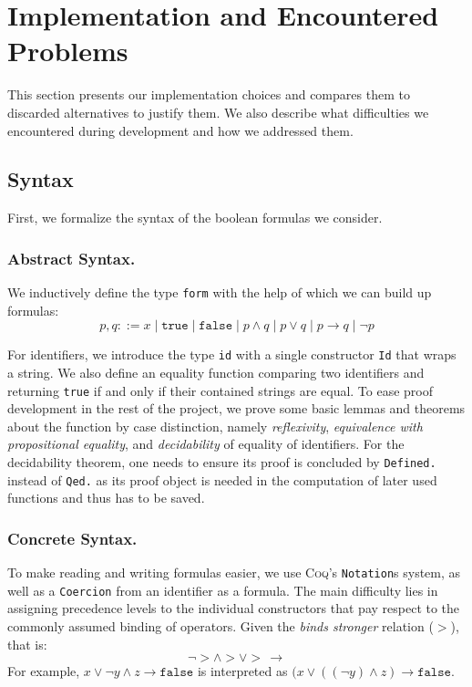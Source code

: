 \section{Implementation and Encountered Problems}\label{sec:impl}

This section presents our implementation choices and compares them to discarded alternatives to justify them. 
We also describe what difficulties we encountered during development and how we addressed them.

\subsection{Syntax}

First, we formalize the syntax of the boolean formulas we consider. 

\subsubsection{Abstract Syntax.}

We inductively define the type \texttt{form} with the help of which we can build up formulas:
\begin{equation}
    p, q ::= x\;|\;\texttt{true}\;|\;\texttt{false}\;|\;p \land q\;|\;p \lor q\;|\;p \rightarrow q\;|\;\neg p
\end{equation}

For identifiers, we introduce the type \texttt{id} with a single constructor \texttt{Id} that wraps a string. 
We also define an equality function comparing two identifiers and returning \texttt{true} if and only if their contained strings are equal. To ease proof development in the rest of the project, we prove some basic lemmas and theorems about the function by case distinction, namely \emph{reflexivity}, \emph{equivalence with propositional equality}, and \emph{decidability} of equality of identifiers.
For the decidability theorem, one needs to ensure its proof is concluded by \texttt{Defined.} instead of \texttt{Qed.} as its proof object is needed in the computation of later used functions and thus has to be saved.

\subsubsection{Concrete Syntax.}

To make reading and writing formulas easier, we use \textsc{Coq}'s \texttt{Notation}s system, as well as a \texttt{Coercion} from an identifier as a formula. 
The main difficulty lies in assigning precedence levels to the individual constructors that pay respect to the commonly assumed binding of operators. 
Given the \emph{binds stronger} relation ($>$), that is:
\begin{equation}
    \neg > \land > \lor >\,\rightarrow
\end{equation}
For example, $x \lor \neg y \land z \rightarrow \texttt{false}$ is interpreted as $(x \lor ((\neg y) \land z) \rightarrow \texttt{false}$. 

